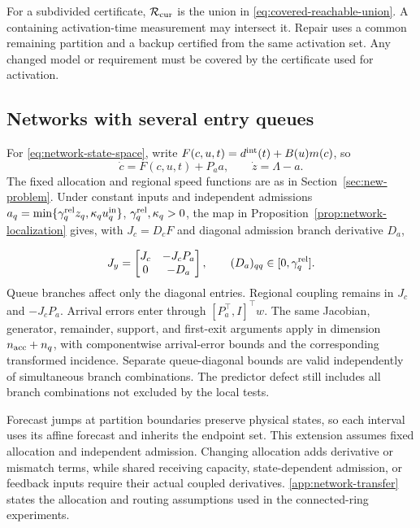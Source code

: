 \documentclass[preprint,12pt]{elsarticle}
\theoremstyle{definition}
\theoremstyle{plain}
\theoremstyle{definition}
\theoremstyle{plain}
\newcommand{\appref}[1]{\ref{#1}}
\begin{document}
For a subdivided certificate, $\mathcal R_{\rm cur}$ is the union in
\eqref{eq:covered-reachable-union}. A containing activation-time measurement
may intersect it. Repair uses a common remaining partition and a backup
certified from the same activation set. Any changed model or requirement
must be covered by the certificate used for activation.

\subsection{Networks with several entry queues}
\label{sec:network-extension}

For \eqref{eq:network-state-space}, write
$F(c,u,t)=d^{\rm int}(t)+B(u)m(c)$, so
\begin{equation}
 \dot c=F(c,u,t)+P_a a,\qquad \dot z=\Lambda-a.
 \label{eq:network-class-queue}
\end{equation}
The fixed allocation and regional speed functions are as in Section~\ref{sec:new-problem}.
Under constant inputs and independent admissions
$a_q=\min\{\gamma_q^{\rm rel}z_q,\kappa_q u_q^{\rm in}\}$,
$\gamma_q^{\rm rel},\kappa_q>0$, the map in
Proposition~\ref{prop:network-localization} gives, with $J_c=D_cF$
and diagonal admission branch derivative $D_a$,

\begin{equation}
 J_y=\begin{bmatrix}J_c&-J_cP_a\\0&-D_a\end{bmatrix},
 \qquad (D_a)_{qq}\in[0,\gamma_q^{\rm rel}].
 \label{eq:network-jacobian}
\end{equation}
Queue branches affect only the diagonal entries. Regional coupling remains
in $J_c$ and $-J_cP_a$. Arrival errors enter through
$[P_a^\top,I]^\top w$. The same Jacobian, generator, remainder, support,
and first-exit arguments apply in dimension $n_{\rm acc}+n_q$, with componentwise
arrival-error bounds and the corresponding transformed incidence.
Separate queue-diagonal bounds are valid independently of simultaneous
branch combinations. The predictor defect still includes all branch
combinations not excluded by the local tests.

Forecast jumps at partition boundaries preserve physical states, so each
interval uses its affine forecast and inherits the endpoint set. This
extension assumes fixed allocation and independent admission. Changing
allocation adds derivative or mismatch terms, while shared receiving
capacity, state-dependent admission, or feedback inputs require their actual
coupled derivatives. \appref{app:network-transfer} states the allocation and routing
assumptions used in the connected-ring experiments.
\end{document}
